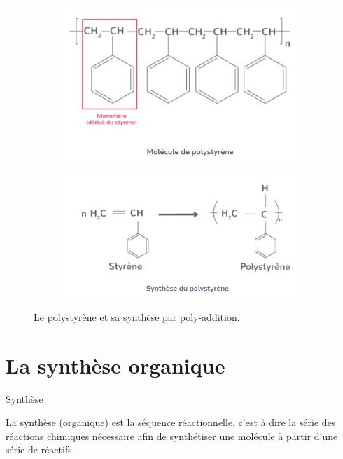 \documentclass[11pt,a4paper]{article}
\begin{document}
\begin{figure}[ht]
\centering
\begin{subfigure}{.45\textwidth}
  \centering
  \includegraphics[width=.95\linewidth]{imgs/c5/polymere1.jpg}  
\end{subfigure}
\begin{subfigure}{.45\textwidth}
  \centering
  \includegraphics[width=.95\linewidth]{imgs/c5/polymere2.jpg}  
\end{subfigure}
\caption{Le polystyrène et sa synthèse par poly-addition.}
\end{figure}

\section{La synthèse organique}
\begin{defn}{Synthèse}

La synthèse (organique) est la séquence réactionnelle, c'est à dire la série des réactions chimiques nécessaire afin de synthétiser une molécule à partir d'une série de réactifs. 
\end{defn}
\end{document}
